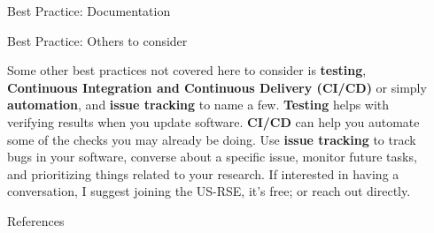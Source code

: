 \documentclass[final]{beamer}
\newlength{\sepwidth}
\newlength{\colwidth}
\newcommand{\separatorcolumn}{\begin{column}{\sepwidth}\end{column}}
\begin{document}
\begin{frame}[t]
\begin{columns}[t]
\begin{column}{\colwidth}
\begin{block}{Best Practice: Documentation}
  \end{block}

  \begin{block}{Best Practice: Others to consider}

    Some other best practices not covered here to consider is \textbf{testing},
    \textbf{Continuous Integration and Continuous Delivery (CI/CD)} or simply
    \textbf{automation}, and \textbf{issue tracking} to name a few.
    \textbf{Testing} helps with verifying results when you update software.
    \textbf{CI/CD} can help you automate some of the checks you may already be
    doing.
    Use \textbf{issue tracking} to track bugs in your software, converse about
    a specific issue, monitor future tasks, and prioritizing things related to
    your research.
    If interested in having a conversation, I suggest joining the US-RSE, it's
    free; or reach out directly.

  \end{block}

  \begin{block}{References}

    \nocite{*}
    \footnotesize{}

  \end{block}

\end{column}

\separatorcolumn
\end{columns}
\end{frame}
\end{document}
